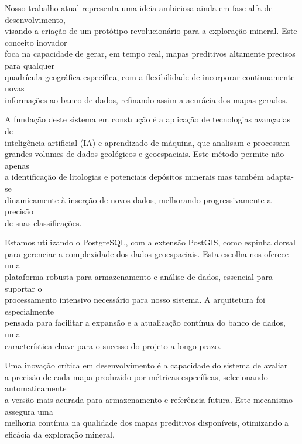 
\par{
Nosso trabalho atual representa uma ideia ambiciosa ainda em fase alfa de desenvolvimento,\\
visando a criação de um protótipo revolucionário para a exploração mineral. Este conceito inovador\\
foca na capacidade de gerar, em tempo real, mapas preditivos altamente precisos para qualquer\\
quadrícula geográfica específica, com a flexibilidade de incorporar continuamente novas\\
informações ao banco de dados, refinando assim a acurácia dos mapas gerados.
}

\par{

A fundação deste sistema em construção é a aplicação de tecnologias avançadas de\\
inteligência artificial (IA) e aprendizado de máquina, que analisam e processam\\
grandes volumes de dados geológicos e geoespaciais. Este método permite não apenas\\
a identificação de litologias e potenciais depósitos minerais mas também adapta-se\\
dinamicamente à inserção de novos dados, melhorando progressivamente a precisão\\
de suas classificações.
}

\par{Estamos utilizando o PostgreSQL, com a extensão PostGIS, como espinha dorsal\\
para gerenciar a complexidade dos dados geoespaciais. Esta escolha nos oferece uma\\
plataforma robusta para armazenamento e análise de dados, essencial para suportar o\\
processamento intensivo necessário para nosso sistema. A arquitetura foi especialmente\\
pensada para facilitar a expansão e a atualização contínua do banco de dados, uma\\
característica chave para o sucesso do projeto a longo prazo.}

\par{Uma inovação crítica em desenvolvimento é a capacidade do sistema de avaliar\\
a precisão de cada mapa produzido por métricas específicas, selecionando automaticamente\\
a versão mais acurada para armazenamento e referência futura. Este mecanismo assegura uma\\
melhoria contínua na qualidade dos mapas preditivos disponíveis, otimizando a\\
eficácia da exploração mineral.}



